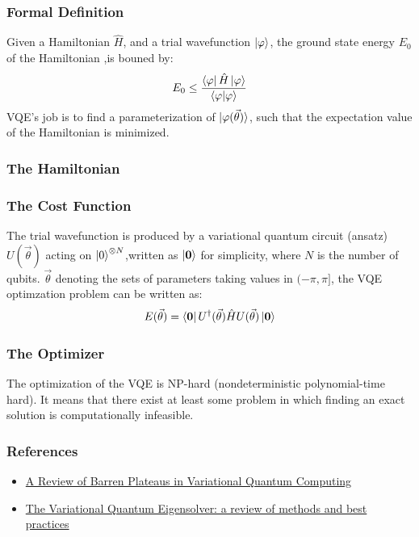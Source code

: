 \documentclass{beamer}
\begin{document}
\begin{frame}
    \frametitle{Formal Definition}
    Given a Hamiltonian \(\hat{H}\), and a trial wavefunction \(\ket{\varphi}\), the ground state energy \(E_0\) of the Hamiltonian ,is bouned by:
    \begin{equation}
        E_0 \leq \frac{\bra{\varphi} \hat{H} \ket{\varphi}}{\braket{\varphi | \varphi}}
    \end{equation}
    VQE's job is to find a parameterization of \(\ket{\varphi(\vec{\theta})}\), such that the expectation value of the Hamiltonian is minimized.
\end{frame}
\begin{frame}
    \frametitle{The Hamiltonian}
\end{frame}

\begin{frame}
    \frametitle{The Cost Function}
    The trial wavefunction is produced by a variational quantum circuit (ansatz) \(U(\vec{\theta})\) acting on \(\ket{0}^{\otimes N}\),written as \(\ket{\textbf{0}}\) for simplicity, where \(N\) is the number of qubits. \(\vec{\theta}\) denoting the sets of parameters taking values in \((- \pi, \pi]\), the VQE optimzation problem can be written as:
    \begin{equation}
        E(\vec{\theta}) = \bra{\textbf{0}} U^{\dagger}(\vec{\theta}) \hat{H} U(\vec{\theta}) \ket{\textbf{0}}
    \end{equation}
\end{frame}
\begin{frame}
    \frametitle{The Optimizer}
    The optimization of the VQE is NP-hard (nondeterministic polynomial-time hard). It means that there exist at least some problem in which finding an exact solution is computationally infeasible.
\end{frame}
\begin{frame}
    \frametitle{References}
    \begin{itemize}
        \item \href{https://arxiv.org/pdf/2405.00781}{A Review of Barren Plateaus in Variational Quantum Computing}
        \item \href{https://arxiv.org/pdf/2111.05176}{The Variational Quantum Eigensolver: a review of methods and best practices}
    \end{itemize}
\end{frame}
\end{document}
